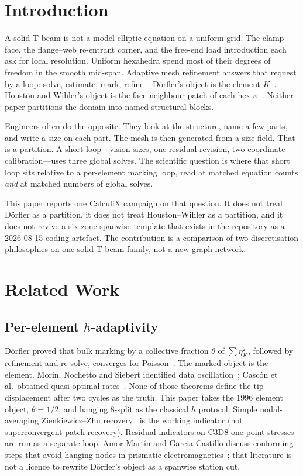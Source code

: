 \documentclass[applsci,article,submit,pdftex,oneauthor]{Definitions/mdpi}
\begin{document}
\section{Introduction}
\label{sec:intro}

A solid T-beam is not a model elliptic equation on a uniform grid. The clamp face, the flange--web re-entrant corner, and the free-end load introduction each ask for local resolution. Uniform hexahedra spend most of their degrees of freedom in the smooth mid-span. Adaptive mesh refinement answers that request by a loop: solve, estimate, mark, refine~\citep{ZienkiewiczZhu1987,Doerfler1996,Chamoin2021}. D{\"o}rfler's object is the element $K$~\citep{Doerfler1996}. Houston and Wihler's object is the face-neighbour patch of each hex $\kappa$~\citep{HoustonWihler2016}. Neither paper partitions the domain into named structural blocks.

Engineers often do the opposite. They look at the structure, name a few parts, and write a size on each part. The mesh is then generated from a size field. That is a partition. A short loop---vision sizes, one residual revision, two-coordinate calibration---uses three global solves. The scientific question is where that short loop sits relative to a per-element marking loop, read at matched equation counts \emph{and} at matched numbers of global solves.

This paper reports one CalculiX campaign on that question. It does not treat D{\"o}rfler as a partition, it does not treat Houston--Wihler as a partition, and it does not revive a six-zone spanwise template that exists in the repository as a 2026-08-15 coding artefact. The contribution is a comparison of two discretisation philosophies on one solid T-beam family, not a new graph network.

\section{Related Work}
\label{sec:rw}

\subsection{Per-element $h$-adaptivity}

D{\"o}rfler proved that bulk marking by a collective fraction $\theta$ of $\sum\eta_K^2$, followed by refinement and re-solve, converges for Poisson~\citep{Doerfler1996}. The marked object is the element. Morin, Nochetto and Siebert identified data oscillation~\citep{Morin2000}; Casc{\'o}n et al.\ obtained quasi-optimal rates~\citep{Cascon2008}. None of those theorems define the tip displacement after two cycles as the truth. This paper takes the 1996 element object, $\theta=1/2$, and hanging 8-split as the classical $h$ protocol. Simple nodal-averaging Zienkiewicz--Zhu recovery~\citep{ZienkiewiczZhu1987} is the working indicator (not superconvergent patch recovery). Residual indicators on C3D8 one-point stresses are run as a separate loop. Amor-Mart\'in and Garcia-Castillo discuss conforming steps that avoid hanging nodes in prismatic electromagnetics~\citep{AmorMartin2021}; that literature is not a licence to rewrite D{\"o}rfler's object as a spanwise station cut.
\end{document}
